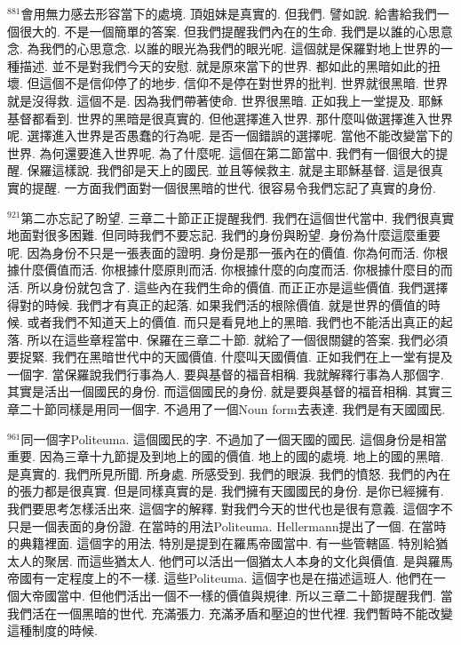 \documentclass{book}
\begin{document}
$^{881}$會用無力感去形容當下的處境.
頂姐妹是真實的.
但我們.
譬如說.
給書給我們一個很大的.
不是一個簡單的答案.
但我們提醒我們內在的生命.
我們是以誰的心思意念.
為我們的心思意念.
以誰的眼光為我們的眼光呢.
這個就是保羅對地上世界的一種描述.
並不是對我們今天的安慰.
就是原來當下的世界.
都如此的黑暗如此的扭壞.
但這個不是信仰停了的地步.
信仰不是停在對世界的批判.
世界就很黑暗.
世界就是沒得救.
這個不是.
因為我們帶著使命.
世界很黑暗.
正如我上一堂提及.
耶穌基督都看到.
世界的黑暗是很真實的.
但他選擇進入世界.
那什麼叫做選擇進入世界呢.
選擇進入世界是否愚蠢的行為呢.
是否一個錯誤的選擇呢.
當他不能改變當下的世界.
為何還要進入世界呢.
為了什麼呢.
這個在第二節當中.
我們有一個很大的提醒.
保羅這樣說.
我們卻是天上的國民.
並且等候救主.
就是主耶穌基督.
這是很真實的提醒.
一方面我們面對一個很黑暗的世代.
很容易令我們忘記了真實的身份.

$^{921}$第二亦忘記了盼望.
三章二十節正正提醒我們.
我們在這個世代當中.
我們很真實地面對很多困難.
但同時我們不要忘記.
我們的身份與盼望.
身份為什麼這麼重要呢.
因為身份不只是一張表面的證明.
身份是那一張內在的價值.
你為何而活.
你根據什麼價值而活.
你根據什麼原則而活.
你根據什麼的向度而活.
你根據什麼目的而活.
所以身份就包含了.
這些內在我們生命的價值.
而正正亦是這些價值.
我們選擇得對的時候.
我們才有真正的起落.
如果我們活的根除價值.
就是世界的價值的時候.
或者我們不知道天上的價值.
而只是看見地上的黑暗.
我們也不能活出真正的起落.
所以在這些章程當中.
保羅在三章二十節.
就給了一個很關鍵的答案.
我們必須要捉緊.
我們在黑暗世代中的天國價值.
什麼叫天國價值.
正如我們在上一堂有提及一個字.
當保羅說我們行事為人.
要與基督的福音相稱.
我就解釋行事為人那個字.
其實是活出一個國民的身份.
而這個國民的身份.
就是要與基督的福音相稱.
其實三章二十節同樣是用同一個字.
不過用了一個Noun form去表達.
我們是有天國國民.

$^{961}$同一個字Politeuma.
這個國民的字.
不過加了一個天國的國民.
這個身份是相當重要.
因為三章十九節提及到地上的國的價值.
地上的國的處境.
地上的國的黑暗.
是真實的.
我們所見所聞.
所身處.
所感受到.
我們的眼淚.
我們的憤怒.
我們的內在的張力都是很真實.
但是同樣真實的是.
我們擁有天國國民的身份.
是你已經擁有.
我們要思考怎樣活出來.
這個字的解釋.
對我們今天的世代也是很有意義.
這個字不只是一個表面的身份證.
在當時的用法Politeuma.
Hellermann提出了一個.
在當時的典籍裡面.
這個字的用法.
特別是提到在羅馬帝國當中.
有一些管轄區.
特別給猶太人的聚居.
而這些猶太人.
他們可以活出一個猶太人本身的文化與價值.
是與羅馬帝國有一定程度上的不一樣.
這些Politeuma.
這個字也是在描述這班人.
他們在一個大帝國當中.
但他們活出一個不一樣的價值與規律.
所以三章二十節提醒我們.
當我們活在一個黑暗的世代.
充滿張力.
充滿矛盾和壓迫的世代裡.
我們暫時不能改變這種制度的時候.
\end{document}
